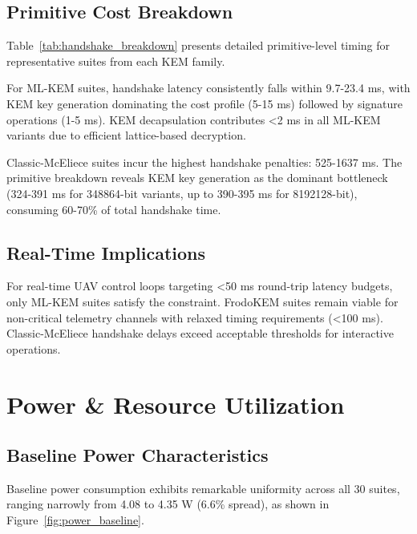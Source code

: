 \documentclass[11pt,a4paper]{article}
\begin{document}
\subsection{Primitive Cost Breakdown}

Table~\ref{tab:handshake_breakdown} presents detailed primitive-level timing for representative suites from each KEM family.



For ML-KEM suites, handshake latency consistently falls within 9.7-23.4 ms, with KEM key generation dominating the cost profile (5-15 ms) followed by signature operations (1-5 ms). KEM decapsulation contributes <2 ms in all ML-KEM variants due to efficient lattice-based decryption.

Classic-McEliece suites incur the highest handshake penalties: 525-1637 ms. The primitive breakdown reveals KEM key generation as the dominant bottleneck (324-391 ms for 348864-bit variants, up to 390-395 ms for 8192128-bit), consuming 60-70\% of total handshake time.

\subsection{Real-Time Implications}

For real-time UAV control loops targeting <50 ms round-trip latency budgets, only ML-KEM suites satisfy the constraint. FrodoKEM suites remain viable for non-critical telemetry channels with relaxed timing requirements (<100 ms). Classic-McEliece handshake delays exceed acceptable thresholds for interactive operations.

\section{Power \& Resource Utilization}

\subsection{Baseline Power Characteristics}

Baseline power consumption exhibits remarkable uniformity across all 30 suites, ranging narrowly from 4.08 to 4.35 W (6.6\% spread), as shown in Figure~\ref{fig:power_baseline}.
\end{document}

